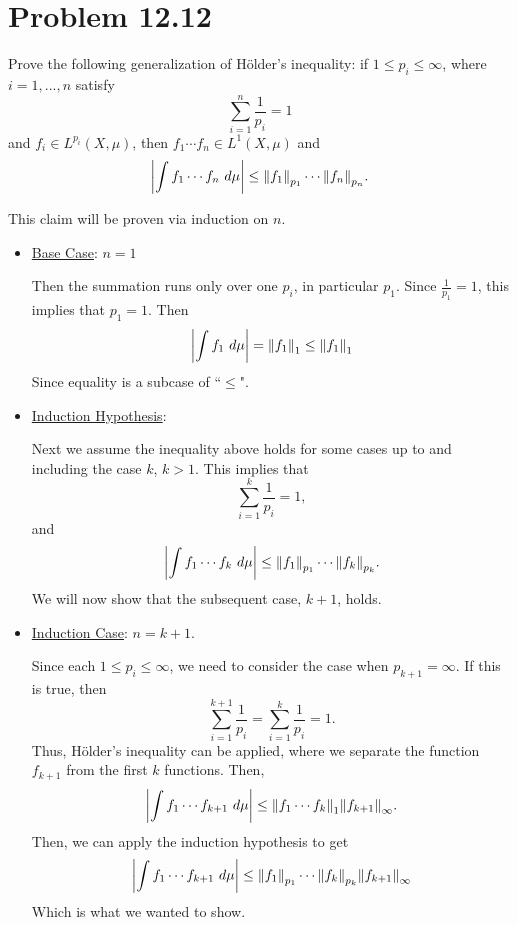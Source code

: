 \section{Problem 12.12}
Prove the following generalization of H\"older's inequality: if $1 \leq p_i \leq \infty$, where $i = 1, ..., n$ satisfy
\[\sum_{i = 1}^n \frac{1}{p_i} = 1\]
and $f_i \in L^{p_i}(X, \mu)$, then $f_1 \cdots f_n \in L^1(X, \mu)$ and 
\[\left| \int f_1 \cdots f_n \ d\mu\right| \leq \norm{f_1}_{p_1} \cdots \norm{f_n}_{p_n}.\]
\partbreak
\begin{solution}

    This claim will be proven via induction on $n$. 
    \begin{itemize}
        \item \underline{Base Case}: $n = 1$

        \hop
        Then the summation runs only over one $p_i$, in particular $p_1$. Since $\frac{1}{p_1} = 1$, this implies that $p_1 = 1$. Then 
        \[\left| \int f_1 \ d\mu\right| = \norm{f_1}_1 \leq \norm{f_1}_1\]
        Since equality is a subcase of ``$\leq$".

        \item \underline{Induction Hypothesis}: 
        
        \hop
        Next we assume the inequality above holds for some cases up to and including the case $k$, $k > 1$. This implies that 
        \[\sum_{i = 1}^k \frac{1}{p_i} = 1,\]
        and
        \[\left| \int f_1 \cdots f_k \ d\mu \right| \leq \norm{f_1}_{p_1} \cdots \norm{f_k}_{p_k}.\]
        We will now show that the subsequent case, $k+1$, holds.

        \item \underline{Induction Case}: $n = k+1$.

        \hop
        Since each $1 \leq p_i \leq \infty$, we need to consider the case when $p_{k+1} = \infty$. If this is true, then 
        \[\sum_{i = 1}^{k+1}\frac{1}{p_i} = \sum_{i = 1}^{k}\frac{1}{p_i} = 1.\]
        Thus, H\"older's inequality can be applied, where we separate the function $f_{k+1}$ from the first $k$ functions. Then, 
        \[\left| \int f_1 \cdots f_{k+1} \ d\mu \right| \leq \norm{f_1\cdots f_{k}}_1 \norm{f_{k+1}}_\infty.\]
        Then, we can apply the induction hypothesis to get 
        \[\left| \int f_1 \cdots f_{k+1} \ d\mu \right| \leq \norm{f_1}_{p_1}\cdots \norm{f_k}_{p_k} \norm{f_{k+1}}_\infty\]
        Which is what we wanted to show. \par


\end{itemize}
\end{solution}
